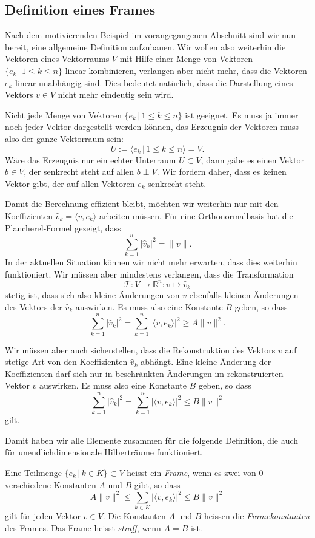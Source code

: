 \subsection{Definition eines Frames}
Nach dem motivierenden Beispiel im vorangegangenen Abschnitt sind wir nun
bereit, eine allgemeine Definition aufzubauen.
Wir wollen also weiterhin die Vektoren eines Vektorraums $V$ mit Hilfe
einer Menge von Vektoren $\{e_k\,|\,1\le k\le n\}$ linear kombinieren,
verlangen aber nicht mehr, dass die Vektoren $e_k$ linear unabhängig sind.
Dies bedeutet natürlich, dass die Darstellung eines Vektors $v\in V$
nicht mehr eindeutig sein wird.

Nicht jede Menge von Vektoren $\{e_k\,|\,1\le k\le n\}$ ist geeignet.
Es muss ja immer noch jeder Vektor dargestellt werden können, das
Erzeugnis der Vektoren muss also der ganze Vektorraum sein:
\[
U
:=
\langle e_k\,|\,1\le k\le n\rangle
=
V.
\]
Wäre das Erzeugnis nur ein echter Unterraum $U\subset V$, dann gäbe es
einen Vektor $b\in V$, der senkrecht steht auf allen $b\perp V$.
Wir fordern daher, dass es keinen Vektor gibt, der auf allen Vektoren $e_k$
senkrecht steht.

Damit die Berechnung effizient bleibt, möchten wir weiterhin nur mit den
Koeffizienten $\hat{v}_k = \langle v,e_k\rangle$ arbeiten müssen.
Für eine Orthonormalbasis hat die Plancherel-Formel gezeigt, dass
\[
\sum_{k=1}^n |\hat{v}_k|^2 = \| v \|.
\]
In der aktuellen Situation können wir nicht mehr erwarten, dass dies 
weiterhin funktioniert.
Wir müssen aber mindestens verlangen, dass die Transformation
\[
\mathcal{T}
\colon
V\to \mathbb R^n
:
v\mapsto \hat{v}_k
\]
stetig ist, dass sich also kleine Änderungen von $v$ ebenfalls
kleinen Änderungen des Vektors der $\hat{v}_k$ auswirken.
Es muss also eine Konstante $B$ geben, so dass
\[
\sum_{k=1}^n |\hat{v}_k|^2
=
\sum_{k=1}^n |\langle v,e_k\rangle|^2
\ge
A \| v \|^2.
\]

Wir müssen aber auch sicherstellen, dass die Rekonstruktion des Vektors $v$
auf stetige Art von den Koeffizienten $\hat{v}_k$ abhängt. 
Eine kleine Änderung der Koeffizienten darf sich nur in beschränkten Änderungen
im rekonstruierten Vektor $v$ auswirken.
Es muss also eine Konstante $B$ geben, so dass
\[
\sum_{k=1}^n |\hat{v}_k|^2
=
\sum_{k=1}^n |\langle v,e_k\rangle|^2
\le
B \| v \|^2
\]
gilt.

Damit haben wir alle Elemente zusammen für die folgende Definition,
die auch für unendlichdimensionale Hilberträume funktioniert.

\begin{definition}
\label{definition:frame}
Eine Teilmenge $\{ e_k\,|\, k\in K\}\subset V$ heisst ein {\em Frame},
wenn es zwei von $0$ verschiedene Konstanten $A$ und $B$ gibt, so dass
\[
A\|v\|^2 \le \sum_{k\in K} |\langle v, e_k\rangle|^2 \le B \| v\|^2
\]
gilt für jeden Vektor $v\in V$.
Die Konstanten $A$ und $B$ heissen die {\em Framekonstanten} des Frames.
Das Frame heisst {\em straff}, wenn $A=B$ ist.
\end{definition}

